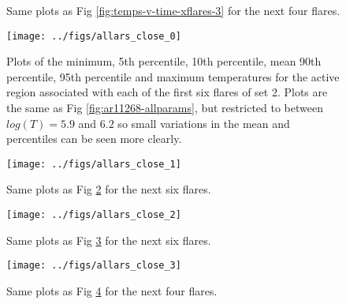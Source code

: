 \documentclass[namedreferences]{solarphysics}
\begin{document}
\begin{article}
\begin{figure}
\caption{Same plots as Fig \ref{fig:temps-v-time-xflares-3} for the next four flares.\label{fig:temps-v-time-xflares-4}}
\end{figure}

\begin{figure}
\begin{centering}
\texttt{[image: ../figs/allars\_close\_0]} 
\par\end{centering}

\caption{Plots of the minimum, 5th percentile, 10th percentile, mean 90th percentile, 95th percentile and maximum temperatures for the active region associated with each of the first six flares of set 2.
Plots are the same as Fig \ref{fig:ar11268-allparams}, but restricted to between $log(T)=5.9$ and $6.2$ so small variations in the mean and percentiles can be seen more clearly.\label{fig:temps-v-time-xflares-1}}
\end{figure}

\begin{figure}
\begin{centering}
\texttt{[image: ../figs/allars\_close\_1]} 
\par\end{centering}

\caption{Same plots as Fig \ref{fig:temps-v-time-xflares-1} for the next six flares.
\label{fig:temps-v-time-xflares-1-1}}
\end{figure}


\begin{figure}
\begin{centering}
\texttt{[image: ../figs/allars\_close\_2]} 
\par\end{centering}

\caption{Same plots as Fig \ref{fig:temps-v-time-xflares-1-1} for the next six flares.\label{fig:temps-v-time-xflares-1-2}}
\end{figure}

\begin{figure}
\begin{centering}
\texttt{[image: ../figs/allars\_close\_3]} 
\par\end{centering}

\caption{Same plots as Fig \ref{fig:temps-v-time-xflares-1-2} for the next four flares.\label{fig:temps-v-time-xflares-1-3}}
\end{figure}


\end{article}
\end{document}
